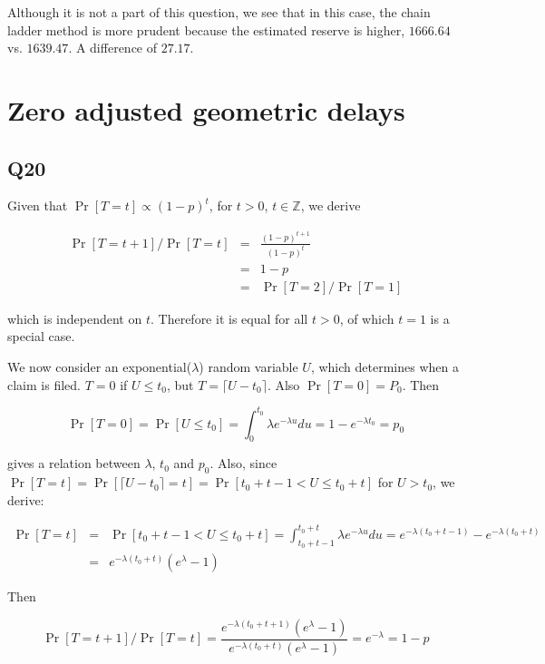 \documentclass[11pt]{article}
\begin{document}
Although it is not a part of this question, we see that in this case, the chain ladder method is more prudent because the estimated reserve is higher, $1666.64$ vs. $1639.47$. A difference of $27.17$.

\section{Zero adjusted geometric delays}

\subsection*{Q20}

Given that $\Pr[T=t] \propto (1-p)^{t}$, for $t > 0$, $t \in \mathbb{Z}$, we derive

\begin{eqnarray}
\Pr[T=t+1]/\Pr[T=t] &=& \frac{(1-p)^{t+1}}{(1-p)^{t}} \\
&=& 1-p \\
&=& \Pr[T=2]/\Pr[T=1]
\end{eqnarray}

which is independent on $t$. Therefore it is equal for all $t>0$, of which $t=1$ is a special case.

We now consider an exponential($\lambda$) random variable  $U$, which determines when a claim is filed. $T = 0$ if $U \leq t_{0}$, but $T = \lceil U - t_{0} \rceil$. Also $\Pr[T=0] = P_{0}$. Then

\begin{equation} \label{eqn:q20_t=0}
\Pr[T=0] = \Pr[U \leq t_{0}] = \int_{0}^{t_{0}} \lambda e^{-\lambda u} du = 1 - e^{-\lambda t_{0}} = p_{0}
\end{equation}

gives a relation between $\lambda$, $ t_{0}$ and $p_{0}$. Also, since $\Pr[T=t] = \Pr[ \lceil U - t_{0} \rceil = t] = \Pr[t_{0} + t - 1< U \leq t_{0} +t]$ for $U > t_{0}$, we derive:

\begin{eqnarray}
\Pr[T=t] &=& \Pr[t_{0} + t - 1 < U \leq t_{0} +t] = \int_{t_{0} + t - 1}^{t_{0} +t} \lambda e^{-\lambda u} du = e^{-\lambda (t_{0} + t - 1)} - e^{-\lambda (t_{0} + t)}\\
&=& e^{-\lambda (t_{0} + t)}(e^{\lambda}-1)
\end{eqnarray}

Then 

\begin{equation}
\Pr[T=t+1]/\Pr[T=t] = \frac{e^{-\lambda (t_{0}+t+1)}(e^{\lambda}-1)}{e^{-\lambda (t_{0} + t)}(e^{\lambda}-1)} = e^{-\lambda} = 1-p
\end{equation}
\end{document}
